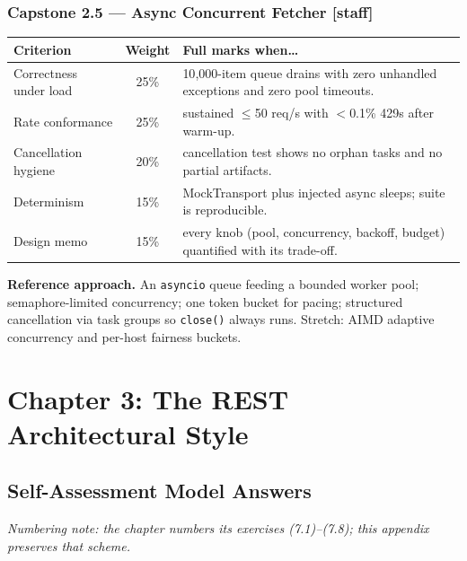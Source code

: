 \subsubsection*{Capstone 2.5 --- Async Concurrent Fetcher [staff]}
\begin{center}\small
\begin{tabularx}{\textwidth}{l c X}
\toprule
\textbf{Criterion} & \textbf{Weight} & \textbf{Full marks when\ldots} \\
\midrule
Correctness under load & 25\% & 10{,}000-item queue drains with zero unhandled exceptions and zero pool timeouts. \\
Rate conformance & 25\% & sustained $\leq$50 req/s with $<$0.1\% 429s after warm-up. \\
Cancellation hygiene & 20\% & cancellation test shows no orphan tasks and no partial artifacts. \\
Determinism & 15\% & MockTransport plus injected async sleeps; suite is reproducible. \\
Design memo & 15\% & every knob (pool, concurrency, backoff, budget) quantified with its trade-off. \\
\bottomrule
\end{tabularx}
\end{center}
\textbf{Reference approach.} An \texttt{asyncio} queue feeding a bounded
worker pool; semaphore-limited concurrency; one token bucket for pacing;
structured cancellation via task groups so \texttt{close()} always runs.
Stretch: AIMD adaptive concurrency and per-host fairness buckets.

\section{Chapter 3: The REST Architectural Style}
\label{sec:sol-ch3}

\subsection{Self-Assessment Model Answers}

\emph{Numbering note: the chapter numbers its exercises (7.1)--(7.8); this
appendix preserves that scheme.}

